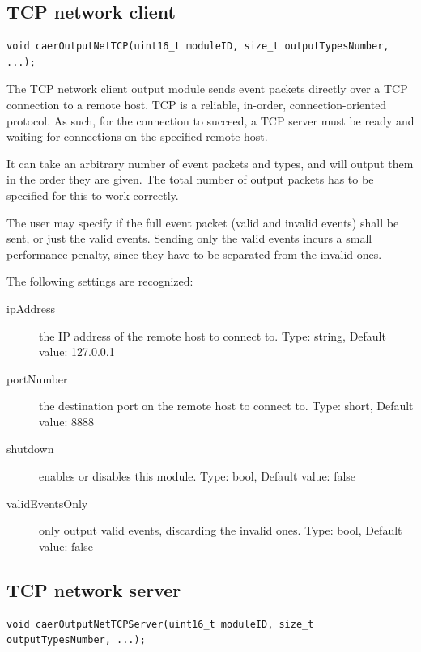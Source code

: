 \documentclass[a4paper,12pt]{report}
\begin{document}
\subsection{TCP network client} \label{subsec:tcp_network_client}

\begin{lstlisting}
void caerOutputNetTCP(uint16_t moduleID, size_t outputTypesNumber, ...);
\end{lstlisting}

The TCP network client output module sends event packets directly over a TCP connection to a remote host.
TCP is a reliable, in-order, connection-oriented protocol. As such, for the connection to succeed, a TCP server must be ready and waiting for connections on the specified remote host.

It can take an arbitrary number of event packets and types, and will output them in the order they are given. The total number of output packets has to be specified for this to work correctly.

The user may specify if the full event packet (valid and invalid events) shall be sent, or just the valid events. Sending only the valid events incurs a small performance penalty, since they have to be separated from the invalid ones.

The following settings are recognized:
\begin{description}
\item[ipAddress] the IP address of the remote host to connect to.
\subitem Type: string, Default value: 127.0.0.1
\item[portNumber] the destination port on the remote host to connect to.
\subitem Type: short, Default value: 8888
\item[shutdown] enables or disables this module.
\subitem Type: bool, Default value: false
\item[validEventsOnly] only output valid events, discarding the invalid ones.
\subitem Type: bool, Default value: false
\end{description}

\subsection{TCP network server} \label{subsec:tcp_network_server}

\begin{lstlisting}
void caerOutputNetTCPServer(uint16_t moduleID, size_t outputTypesNumber, ...);
\end{lstlisting}
\end{document}
